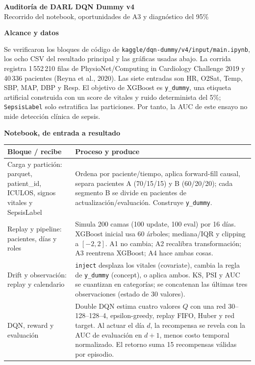 \documentclass[10pt,a4paper]{article}
\newcommand{\smallsection}[1]{\vspace{2pt}\textbf{\large #1}\par\vspace{1pt}}
\begin{document}
\small
\begin{center}
{\LARGE\bfseries Auditoría de DARL DQN Dummy v4}\\[-1pt]
{\small Recorrido del notebook, oportunidades de A3 y diagnóstico del 95\%}
\end{center}
\vspace{-3pt}

\smallsection{Alcance y datos}
Se verificaron los bloques de código de \texttt{kaggle/dqn-dummy/v4/input/main.ipynb},
los ocho CSV del resultado principal y las gráficas usadas abajo. La corrida
registra 1\,552\,210 filas de PhysioNet/Computing in Cardiology Challenge 2019
y 40\,336 pacientes (Reyna et al., 2020). Las siete entradas son HR, O2Sat,
Temp, SBP, MAP, DBP y Resp. El objetivo de XGBoost es \texttt{y\_dummy}, una
etiqueta artificial construida con un score de vitales y ruido determinista
del 5\%; \texttt{SepsisLabel} solo estratifica las particiones. Por tanto, la
AUC de este ensayo no mide detección clínica de sepsis.

\smallsection{Notebook, de entrada a resultado}
\begin{tabularx}{\textwidth}{@{}p{}Y@{}}
\toprule
\textbf{Bloque / recibe} & \textbf{Proceso y produce} \\
\midrule
Carga y partición: parquet, patient\_id, ICULOS, signos vitales y SepsisLabel
& Ordena por paciente/tiempo, aplica forward-fill causal, separa pacientes
A (70/15/15) y B (60/20/20); cada segmento B se divide en pacientes de
actualización/evaluación. Construye \texttt{y\_dummy}. \\
Replay y pipeline: pacientes, días y roles
& Simula 200 camas (100 update, 100 eval) por 16 días. XGBoost inicial usa
60 árboles; mediana/IQR y clipping a \([-2,2]\). A1 no cambia; A2 recalibra
transformación; A3 reentrena XGBoost; A4 hace ambas cosas. \\
Drift y observación: replay y calendario
& \texttt{inject} desplaza los vitales (covariate), cambia la regla de
\texttt{y\_dummy} (concept), o aplica ambos. KS, PSI y AUC se cuantizan en
categorías; se concatenan las últimas tres observaciones (estado de 30 valores). \\
DQN, reward y evaluación
& Double DQN estima cuatro valores \(Q\) con una red 30--128--128--4,
epsilon-greedy, replay FIFO, Huber y red target. Al actuar el día \(d\),
la recompensa se revela con la AUC de evaluación en \(d+1\), menos costo
temporal normalizado. El retorno suma 15 recompensas válidas por episodio. \\
\bottomrule
\end{tabularx}
\end{document}
